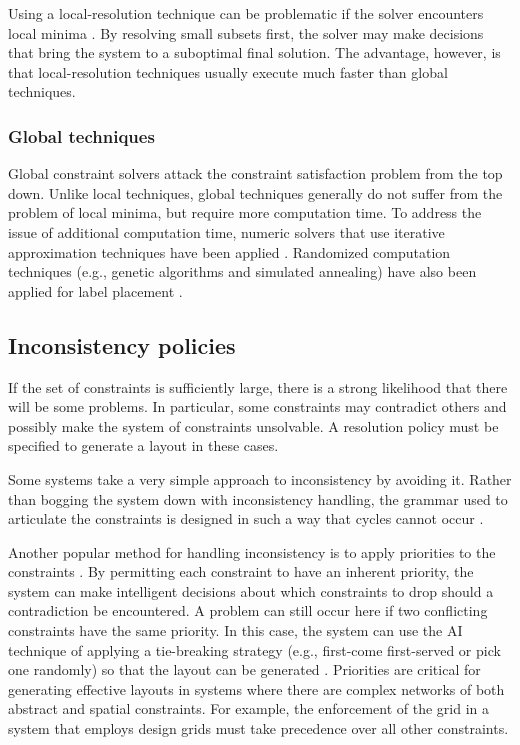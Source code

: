     Using a local-resolution technique can be problematic if the solver encounters local minima \citep{borning-2}. By resolving small subsets first, the solver may make decisions that bring the system to a suboptimal final solution. The advantage, however, is that local-resolution techniques usually execute much faster than global techniques.

    \subsubsection{Global techniques}

    Global constraint solvers attack the constraint satisfaction problem from the top down. Unlike local techniques, global techniques generally do not suffer from the problem of local minima, but require more computation time. To address the issue of additional computation time, numeric solvers that use iterative approximation techniques have been applied \citep{kurlander-1}. Randomized computation techniques (e.g., genetic algorithms and simulated annealing) have also been applied for label placement \citep{christensen-2}.

    \subsection{Inconsistency policies}

    If the set of constraints is sufficiently large, there is a strong likelihood that there will be some problems. In particular, some constraints may contradict others and possibly make the system of constraints unsolvable. A resolution policy must be specified to generate a layout in these cases.

    Some systems take a very simple approach to inconsistency by avoiding it. Rather than bogging the system down with inconsistency handling, the grammar used to articulate the constraints is designed in such a way that cycles cannot occur \citep{weitzman-2}.

    Another popular method for handling inconsistency is to apply priorities to the constraints \citep{graf-1}. By permitting each constraint to have an inherent priority, the system can make intelligent decisions about which constraints to drop should a contradiction be encountered. A problem can still occur here if two conflicting constraints have the same priority. In this case, the system can use the AI technique of applying a tie-breaking strategy (e.g., first-come first-served or pick one randomly) so that the layout can be generated \citep{nilsson-1}. Priorities are critical for generating effective layouts in systems where there are complex networks of both abstract and spatial constraints. For example, the enforcement of the grid in a system that employs design grids must take precedence over all other constraints.

